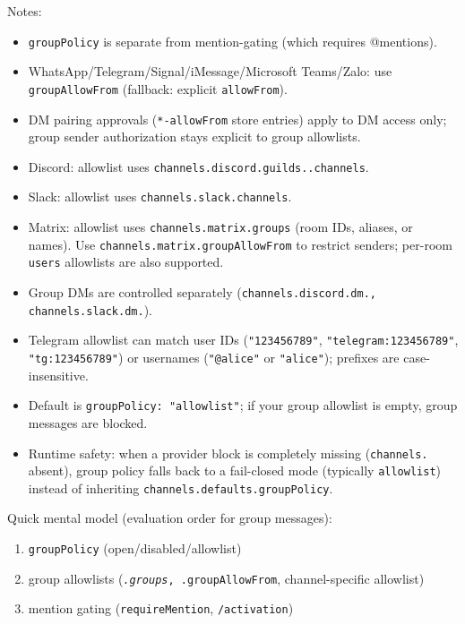 Notes:

\begin{itemize}
  \item \texttt{groupPolicy} is separate from mention-gating (which requires @mentions).
  \item WhatsApp/Telegram/Signal/iMessage/Microsoft Teams/Zalo: use \texttt{groupAllowFrom} (fallback: explicit \texttt{allowFrom}).
  \item DM pairing approvals (\texttt{*-allowFrom} store entries) apply to DM access only; group sender authorization stays explicit to group allowlists.
  \item Discord: allowlist uses \texttt{channels.discord.guilds..channels}.
  \item Slack: allowlist uses \texttt{channels.slack.channels}.
  \item Matrix: allowlist uses \texttt{channels.matrix.groups} (room IDs, aliases, or names). Use \texttt{channels.matrix.groupAllowFrom} to restrict senders; per-room \texttt{users} allowlists are also supported.
  \item Group DMs are controlled separately (\texttt{channels.discord.dm.\textit{}, \texttt{channels.slack.dm.}}).
  \item Telegram allowlist can match user IDs (\texttt{"123456789"}, \texttt{"telegram:123456789"}, \texttt{"tg:123456789"}) or usernames (\texttt{"@alice"} or \texttt{"alice"}); prefixes are case-insensitive.
  \item Default is \texttt{groupPolicy: "allowlist"}; if your group allowlist is empty, group messages are blocked.
  \item Runtime safety: when a provider block is completely missing (\texttt{channels.} absent), group policy falls back to a fail-closed mode (typically \texttt{allowlist}) instead of inheriting \texttt{channels.defaults.groupPolicy}.
\end{itemize}


Quick mental model (evaluation order for group messages):

\begin{enumerate}
  \item \texttt{groupPolicy} (open/disabled/allowlist)
  \item group allowlists (\texttt{\textit{.groups}, \texttt{}.groupAllowFrom}, channel-specific allowlist)
  \item mention gating (\texttt{requireMention}, \texttt{/activation})
\end{enumerate}


